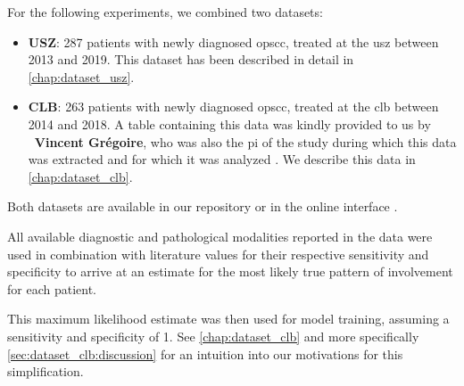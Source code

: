 \begin{tcolorbox}[title=\faIcon{database} Data, parbox=false]
    For the following experiments, we combined two datasets:

    \begin{itemize}[leftmargin=7mm]
        \item[\faIcon{hospital}] \textbf{USZ}: 287 patients with newly diagnosed \gls{opscc}, treated at the \acrlong{usz} between 2013 and 2019. This dataset has been described in detail in \cref{chap:dataset_usz}.
        \item[\faIcon{hospital}] \textbf{CLB}: 263 patients with newly diagnosed \gls{opscc}, treated at the \acrlong{clb} between 2014 and 2018. A table containing this data was kindly provided to us by ~\textbf{Vincent Grégoire}, who was also the \gls{pi} of the study during which this data was extracted and for which it was analyzed \cite{bauwens_prevalence_2021}. We describe this data in \cref{chap:dataset_clb}.
    \end{itemize}

    Both datasets are available in our repository  or in the online interface \inlinelyproxlogo{}.

    All available diagnostic and pathological modalities reported in the data were used in combination with literature values for their respective sensitivity and specificity \cite{de_bondt_detection_2007,kyzas_18f-fluorodeoxyglucose_2008} to arrive at an estimate for the most likely true pattern of involvement for each patient.

    This maximum likelihood estimate was then used for model training, assuming a sensitivity and specificity of 1. See \cref{chap:dataset_clb} and more specifically \cref{sec:dataset_clb:discussion} for an intuition into our motivations for this simplification.
\end{tcolorbox}
